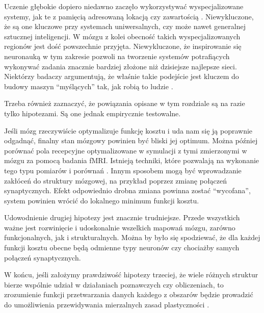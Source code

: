 Uczenie głębokie dopiero niedawno zaczęło wykorzystywać wyspecjalizowane systemy, jak te z pamięcią adresowaną lokacją czy zawartością \cite{graves2014neural}.
Niewykluczone, że są one kluczowe przy systemach uniwersalnych, czy może nawet generalnej sztucznej inteligencji.
W mózgu z kolei obecność takich wyspecjalizowanych regionów jest dość powszechnie przyjęta.
Niewykluczone, że inspirowanie się neuronauką w tym zakresie pozwoli na tworzenie systemów potrafiących wykonywać zadania znacznie bardziej złożone niż dzisiejsze najlepsze sieci.
Niektórzy badaczy argumentują, że właśnie takie podejście jest kluczem do budowy maszyn ``myślących'' tak, jak robią to ludzie \cite{lake2017building}.

Trzeba również zaznaczyć, że powiązania opisane w tym rozdziale są na razie tylko hipotezami.
Są one jednak empirycznie testowalne.

Jeśli mózg rzeczywiście optymalizuje funkcję kosztu i uda nam się ją poprawnie odgadnąć, finalny stan mózgowy powinien być bliski jej optimum.
Można później porównać pola recepcyjne optymalizowane w symulacji z tymi zmierzonymi w mózgu za pomocą badania fMRI.
Istnieją techniki, które pozwalają na wykonanie tego typu pomiarów i porównań \cite{dumoulin2008population}.
Innym sposobem mogą być wprowadzanie zakłóceń do struktury mózgowej, na przykład poprzez zmianę połączeń synaptycznych.
Efekt odpowiednio drobna zmiana powinna zostać ``wycofana'', system powinien wrócić do lokalnego minimum funkcji kosztu.

Udowodnienie drugiej hipotezy jest znacznie trudniejsze.
Przede wszystkich ważne jest rozwinięcie i udoskonalnie wszelkich mapowań mózgu, zarówno funkcjonalnych, jak i strukturalnych.
Można by było się spodziewać, że dla każdej funkcji kosztu obecne będą odmienne typy neuronów czy chociażby samych połączeń synaptycznych.

W końcu, jeśli założymy prawdziwość hipotezy trzeciej, że wiele różnych struktur bierze wspólnie udział w działaniach poznawczych czy obliczeniach, to zrozumienie funkcji przetwarzania danych każdego z obszarów będzie prowadzić do umożliwienia przewidywania mierzalnych zasad plastyczności \cite{marblestone2016toward}.
